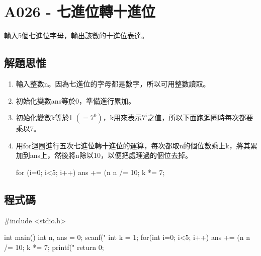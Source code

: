 \section{A026 - 七進位轉十進位}
輸入5個七進位字母，輸出該數的十進位表達。

\subsection{解題思惟}

\begin{enumerate}
	\item 輸入整數n。因為七進位的字母都是數字，所以可用整數讀取。
	\item 初始化變數ans等於0，準備進行累加。
	\item 初始化變數k等於1 $(=7^0)$，k用來表示$7^i$之值，所以下面跑迴圈時每次都要乘以7。
	\item 用for迴圈進行五次七進位轉十進位的運算，每次都取n的個位數乘上k，將其累加到ans上，然後將n除以10，以便把處理過的個位去掉。
	\begin{inside}
	for (i=0; i<5; i++) {
		ans += (n%
		n /= 10;
		k *= 7;
	}
	\end{inside}
\end{enumerate}

\subsection{程式碼}
\begin{cppcode}
#include <stdio.h>

int main()
{
	int n, ans = 0;
	scanf("%
	int k = 1;
	for(int i=0; i<5; i++) {
		ans += (n%
		n /= 10;
		k *= 7;
	}
	printf("%
	return 0;
}
\end{cppcode}
